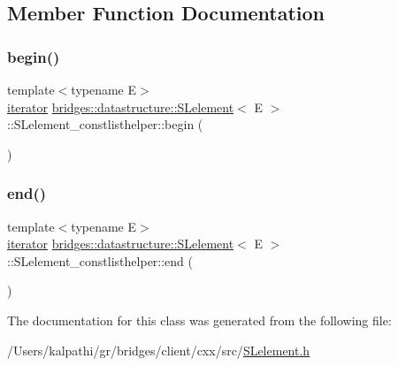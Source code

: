 \subsection{Member Function Documentation}
\mbox{\label{classbridges_1_1datastructure_1_1_s_lelement_1_1_s_lelement__constlisthelper_a2e2adc3b30f68514a90af399f47624ac}} 
\subsubsection{\texorpdfstring{begin()}{begin()}}
{\footnotesize\ttfamily template$<$typename E$>$ \\
\mbox{\hyperlink{classbridges_1_1datastructure_1_1_s_lelement_1_1_s_lelement__constlisthelper_1_1iterator}{iterator}} \mbox{\hyperlink{classbridges_1_1datastructure_1_1_s_lelement}{bridges\+::datastructure\+::\+S\+Lelement}}$<$ E $>$\+::S\+Lelement\+\_\+constlisthelper\+::begin (\begin{DoxyParamCaption}{ }\end{DoxyParamCaption})\hspace{0.3cm}{\ttfamily [inline]}}

\mbox{\label{classbridges_1_1datastructure_1_1_s_lelement_1_1_s_lelement__constlisthelper_a4ec5e5fe4b53638dfada78d44c7dd5b2}} 
\subsubsection{\texorpdfstring{end()}{end()}}
{\footnotesize\ttfamily template$<$typename E$>$ \\
\mbox{\hyperlink{classbridges_1_1datastructure_1_1_s_lelement_1_1_s_lelement__constlisthelper_1_1iterator}{iterator}} \mbox{\hyperlink{classbridges_1_1datastructure_1_1_s_lelement}{bridges\+::datastructure\+::\+S\+Lelement}}$<$ E $>$\+::S\+Lelement\+\_\+constlisthelper\+::end (\begin{DoxyParamCaption}{ }\end{DoxyParamCaption})\hspace{0.3cm}{\ttfamily [inline]}}



The documentation for this class was generated from the following file\+:\begin{DoxyCompactItemize}
\item 
/\+Users/kalpathi/gr/bridges/client/cxx/src/\mbox{\hyperlink{_s_lelement_8h}{S\+Lelement.\+h}}\end{DoxyCompactItemize}
